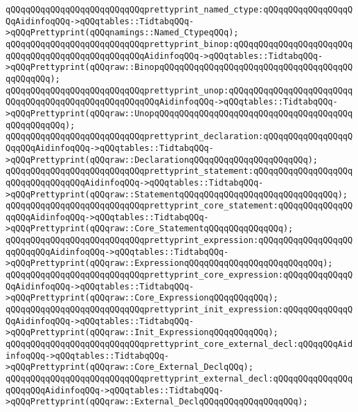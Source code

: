 \verb|qQQqqQQqqQQqqQQqqQQqqQQqqQQqprettyprint_named_ctype:qQQqqQQqqQQqqQQqqQQqAidinfoqQQq->qQQqtables::TidtabqQQq->qQQqPrettyprint(qQQqnamings::Named_CtypeqQQq);|\newline
\newline
\verb|qQQqqQQqqQQqqQQqqQQqqQQqqQQqprettyprint_binop:qQQqqQQqqQQqqQQqqQQqqQQqqQQqqQQqqQQqqQQqqQQqqQQqqQQqAidinfoqQQq->qQQqtables::TidtabqQQq->qQQqPrettyprint(qQQqraw::BinopqQQqqQQqqQQqqQQqqQQqqQQqqQQqqQQqqQQqqQQqqQQqqQQq);|\newline
\verb|qQQqqQQqqQQqqQQqqQQqqQQqqQQqprettyprint_unop:qQQqqQQqqQQqqQQqqQQqqQQqqQQqqQQqqQQqqQQqqQQqqQQqqQQqqQQqAidinfoqQQq->qQQqtables::TidtabqQQq->qQQqPrettyprint(qQQqraw::UnopqQQqqQQqqQQqqQQqqQQqqQQqqQQqqQQqqQQqqQQqqQQqqQQqqQQq);|\newline
\verb|qQQqqQQqqQQqqQQqqQQqqQQqqQQqprettyprint_declaration:qQQqqQQqqQQqqQQqqQQqqQQqAidinfoqQQq->qQQqtables::TidtabqQQq->qQQqPrettyprint(qQQqraw::DeclarationqQQqqQQqqQQqqQQqqQQqqQQq);|\newline
\verb|qQQqqQQqqQQqqQQqqQQqqQQqqQQqprettyprint_statement:qQQqqQQqqQQqqQQqqQQqqQQqqQQqqQQqqQQqAidinfoqQQq->qQQqtables::TidtabqQQq->qQQqPrettyprint(qQQqraw::StatementqQQqqQQqqQQqqQQqqQQqqQQqqQQqqQQq);|\newline
\verb|qQQqqQQqqQQqqQQqqQQqqQQqqQQqprettyprint_core_statement:qQQqqQQqqQQqqQQqqQQqAidinfoqQQq->qQQqtables::TidtabqQQq->qQQqPrettyprint(qQQqraw::Core_StatementqQQqqQQqqQQqqQQq);|\newline
\verb|qQQqqQQqqQQqqQQqqQQqqQQqqQQqprettyprint_expression:qQQqqQQqqQQqqQQqqQQqqQQqqQQqAidinfoqQQq->qQQqtables::TidtabqQQq->qQQqPrettyprint(qQQqraw::ExpressionqQQqqQQqqQQqqQQqqQQqqQQqqQQq);|\newline
\verb|qQQqqQQqqQQqqQQqqQQqqQQqqQQqprettyprint_core_expression:qQQqqQQqqQQqqQQqAidinfoqQQq->qQQqtables::TidtabqQQq->qQQqPrettyprint(qQQqraw::Core_ExpressionqQQqqQQqqQQq);|\newline
\verb|qQQqqQQqqQQqqQQqqQQqqQQqqQQqprettyprint_init_expression:qQQqqQQqqQQqqQQqAidinfoqQQq->qQQqtables::TidtabqQQq->qQQqPrettyprint(qQQqraw::Init_ExpressionqQQqqQQqqQQq);|\newline
\verb|qQQqqQQqqQQqqQQqqQQqqQQqqQQqprettyprint_core_external_decl:qQQqqQQqAidinfoqQQq->qQQqtables::TidtabqQQq->qQQqPrettyprint(qQQqraw::Core_External_DeclqQQq);|\newline
\verb|qQQqqQQqqQQqqQQqqQQqqQQqqQQqprettyprint_external_decl:qQQqqQQqqQQqqQQqqQQqqQQqAidinfoqQQq->qQQqtables::TidtabqQQq->qQQqPrettyprint(qQQqraw::External_DeclqQQqqQQqqQQqqQQqqQQq);|\newline
